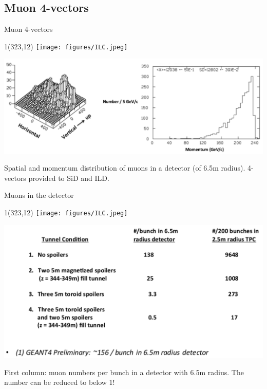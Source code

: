 \documentclass[xcolor={dvipsnames}]{beamer}
\newcommand{\ilclogo}{
  \setlength{\TPHorizModule}{1pt}
  \setlength{\TPVertModule}{1pt}
  \begin{textblock}{1}(323,12)
   \texttt{[image: figures/ILC.jpeg]}
  \end{textblock}
}
\begin{document}
\subsection{Muon 4-vectors}
\begin{frame}{Muon 4-vectors}
\ilclogo
\begin{center}
\includegraphics[height=0.5\textheight]{Muon_4-vectors.pdf}
\end{center}
Spatial and momentum distribution of muons in a detector (of 6.5m radius).
4-vectors provided to SiD and ILD.
\end{frame}
\begin{frame}{Muons in the detector}
\ilclogo
\begin{center}
\includegraphics[height=0.6\textheight]{Muon_numbers.pdf}
\end{center}
First column: muon numbers per bunch in a detector with 6.5m radius.
The number can be reduced to below 1!
\end{frame}
\end{document}
